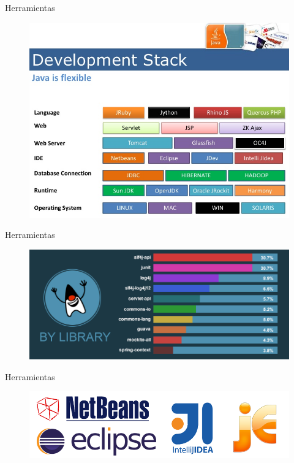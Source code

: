 \documentclass{beamer}
\begin{document}
\begin{frame}{Herramientas}
	\begin{figure}
		\centering
		\includegraphics[width=0.9\linewidth]{Images/flexible}
	\end{figure}
\end{frame}

\begin{frame}{Herramientas}
	\begin{figure}
		\centering
		\includegraphics[width=0.9\linewidth]{Images/library}
	\end{figure}
\end{frame}


\begin{frame}{Herramientas}
	\begin{figure}
		\centering
		\includegraphics[width=0.9\linewidth]{Images/ide}
	\end{figure}
\end{frame}
\end{document}
